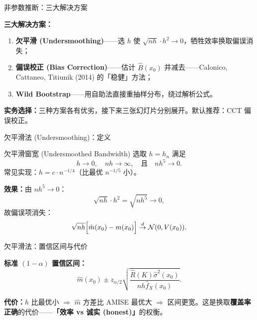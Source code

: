\documentclass[aspectratio=169, 10pt]{beamer}
\begin{document}
\begin{frame}{非参数推断：三大解决方案}

  \begin{highlightbox}
    \textbf{三大解决方案：}
    \begin{enumerate}
      \item \textbf{欠平滑 (Undersmoothing)}——选 $h$ 使 $\sqrt{nh}\cdot h^2 \to 0$，牺牲效率换取偏误消失；
      \item \textbf{偏误校正 (Bias Correction)}——估计 $\hat B(x_0)$ 并减去——Calonico, Cattaneo, Titiunik (2014) 的「稳健」方法；
      \item \textbf{Wild Bootstrap}——用自助法直接重抽样分布，绕过解析公式。
    \end{enumerate}
  \end{highlightbox}

  \begin{keybox}
    \textbf{实务选择：}三种方案各有优劣，接下来三张幻灯片分别展开。默认推荐：CCT 偏误校正。
  \end{keybox}

\end{frame}


\begin{frame}{欠平滑法 (Undersmoothing)：定义}

  \begin{definitionbox}{欠平滑窗宽 (Undersmoothed Bandwidth)}
    选取 $h = h_n$ 满足
    \[
      h \to 0,\quad nh\to\infty,\quad \text{且}\quad nh^5 \to 0.
    \]
    常见实现：$h = c\cdot n^{-1/4}$（比最优 $n^{-1/5}$ 小）。
  \end{definitionbox}

  \textbf{效果：}由 $nh^5\to 0$：
  \[
    \sqrt{nh}\cdot h^2 = \sqrt{nh^5} \to 0,
  \]
  故偏误项消失：
  \[
    \sqrt{nh}\Bigl[\hat m(x_0) - m(x_0)\Bigr] \overset{d}{\to} \mathcal{N}(0, V(x_0)).
  \]

\end{frame}


\begin{frame}{欠平滑法：置信区间与代价}

  \textbf{标准 $(1-\alpha)$ 置信区间：}
  \[
    \hat m(x_0) \pm z_{\alpha/2}\sqrt{\frac{\hat R(K) \hat\sigma^2(x_0)}{nh\hat f_X(x_0)}}.
  \]

  \begin{keybox}
    \textbf{代价：}$h$ 比最优小 $\Rightarrow$ $\hat m$ 方差比 AMISE 最优大 $\Rightarrow$ 区间更宽。这是换取\textbf{覆盖率正确}的代价——\textbf{「效率 vs 诚实 (honest)」}的权衡。
  \end{keybox}

\end{frame}
\end{document}
